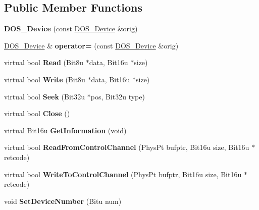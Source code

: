 \subsection*{Public Member Functions}
\begin{DoxyCompactItemize}
\item 
\hypertarget{classDOS__Device_ad955e1e07cfe5bb6c3aca63cbb897db3}{{\bfseries D\-O\-S\-\_\-\-Device} (const \hyperlink{classDOS__Device}{D\-O\-S\-\_\-\-Device} \&orig)}\label{classDOS__Device_ad955e1e07cfe5bb6c3aca63cbb897db3}

\item 
\hypertarget{classDOS__Device_aec249c3f09306a702e292a5f9f64c96b}{\hyperlink{classDOS__Device}{D\-O\-S\-\_\-\-Device} \& {\bfseries operator=} (const \hyperlink{classDOS__Device}{D\-O\-S\-\_\-\-Device} \&orig)}\label{classDOS__Device_aec249c3f09306a702e292a5f9f64c96b}

\item 
\hypertarget{classDOS__Device_a87e1322f373b3d9358ccd165c0bdb750}{virtual bool {\bfseries Read} (Bit8u $\ast$data, Bit16u $\ast$size)}\label{classDOS__Device_a87e1322f373b3d9358ccd165c0bdb750}

\item 
\hypertarget{classDOS__Device_a7be957dd43a15d35346878f1e29231be}{virtual bool {\bfseries Write} (Bit8u $\ast$data, Bit16u $\ast$size)}\label{classDOS__Device_a7be957dd43a15d35346878f1e29231be}

\item 
\hypertarget{classDOS__Device_a8d5e83453557f33179f118808d4e3d5b}{virtual bool {\bfseries Seek} (Bit32u $\ast$pos, Bit32u type)}\label{classDOS__Device_a8d5e83453557f33179f118808d4e3d5b}

\item 
\hypertarget{classDOS__Device_a75ab586e87f58a6474f69064d417e8d7}{virtual bool {\bfseries Close} ()}\label{classDOS__Device_a75ab586e87f58a6474f69064d417e8d7}

\item 
\hypertarget{classDOS__Device_acd253fc52af9dca4c5aac3a471e59b00}{virtual Bit16u {\bfseries Get\-Information} (void)}\label{classDOS__Device_acd253fc52af9dca4c5aac3a471e59b00}

\item 
\hypertarget{classDOS__Device_ad64f103256041be936e917a6f9ffb863}{virtual bool {\bfseries Read\-From\-Control\-Channel} (Phys\-Pt bufptr, Bit16u size, Bit16u $\ast$retcode)}\label{classDOS__Device_ad64f103256041be936e917a6f9ffb863}

\item 
\hypertarget{classDOS__Device_afbf53e55c13effffa2168cc095eb906e}{virtual bool {\bfseries Write\-To\-Control\-Channel} (Phys\-Pt bufptr, Bit16u size, Bit16u $\ast$retcode)}\label{classDOS__Device_afbf53e55c13effffa2168cc095eb906e}

\item 
\hypertarget{classDOS__Device_adf2a68f874fd5bd4ef6160dc48ef3f9d}{void {\bfseries Set\-Device\-Number} (Bitu num)}\label{classDOS__Device_adf2a68f874fd5bd4ef6160dc48ef3f9d}

\end{DoxyCompactItemize}


